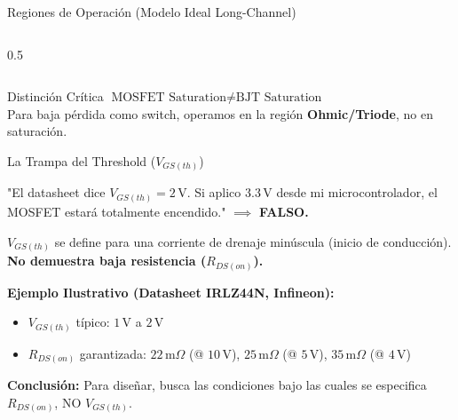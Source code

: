 \documentclass[aspectratio=169, table]{beamer}
\begin{document}
\begin{frame}{Regiones de Operación (Modelo Ideal Long-Channel)}
\begin{columns}
\begin{column}{0.5\textwidth}
        \end{column}
    \end{columns}
    \vspace{0.2cm}
    \begin{alertblock}{Distinción Crítica}
        \centering $\text{MOSFET Saturation} \neq \text{BJT Saturation}$ \\
        \small Para baja pérdida como switch, operamos en la región \textbf{Ohmic/Triode}, no en saturación.
    \end{alertblock}
\end{frame}

\begin{frame}{La Trampa del Threshold ($V_{GS(th)}$)}
    \begin{tcolorbox}[colback=red!5, colframe=red!70!black, title=Error Común]
        "El datasheet dice $V_{GS(th)} = 2\,\text{V}$. Si aplico $3.3\,\text{V}$ desde mi microcontrolador, el MOSFET estará totalmente encendido." $\implies$ \textbf{FALSO.}
    \end{tcolorbox}
    
    $V_{GS(th)}$ se define para una corriente de drenaje minúscula (inicio de conducción). \textbf{No demuestra baja resistencia ($R_{DS(on)}$).}
    
    \vspace{0.2cm}
    {\small
    \textbf{Ejemplo Ilustrativo (Datasheet IRLZ44N, Infineon):}
    \begin{itemize}
        \item $V_{GS(th)}$ típico: $1\,\text{V}$ a $2\,\text{V}$
        \item $R_{DS(on)}$ garantizada: $22\,\text{m}\Omega$ (@ $10\,\text{V}$), $25\,\text{m}\Omega$ (@ $5\,\text{V}$), $35\,\text{m}\Omega$ (@ $4\,\text{V}$)
    \end{itemize}
    }
    
    \vspace{0.2cm}
    \textbf{Conclusión:} Para diseñar, busca las condiciones bajo las cuales se especifica $R_{DS(on)}$, NO $V_{GS(th)}$.
\end{frame}
\end{document}

